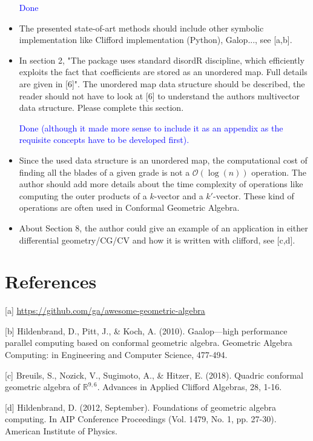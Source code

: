\documentclass{article}
\begin{document}
\begin{itemize}
  \textcolor{blue}{Done}
  
\item The presented state-of-art methods should include other symbolic
  implementation like Clifford implementation (Python), Galop..., see
  [a,b].

\item In section 2, "The package uses standard disordR discipline,
  which efficiently exploits the fact that coefficients are stored as
  an unordered map.  Full details are given in [6]".  The unordered
  map data structure should be described, the reader should not have
  to look at [6] to understand the authors multivector data
  structure. Please complete this section.

\textcolor{blue}{Done (although it made more sense to include it as an
  appendix as the requisite concepts have to be developed first).}
  
\item Since the used data structure is an unordered map, the
  computational cost of finding all the blades of a given grade is not
  a $\mathcal{O}(\log(n))$ operation.  The author should add more
  details about the time complexity of operations like computing the
  outer products of a $k$-vector and a $k'$-vector.  These kind of
  operations are often used in Conformal Geometric Algebra.

\item About Section 8, the author could give an example of an
  application in either differential geometry/CG/CV and how it is
  written with clifford, see [c,d].

\end{itemize}

\section*{References}

\begin{description}
\item{[a]} \url{https://github.com/ga/awesome-geometric-algebra}
\item{[b]} Hildenbrand, D., Pitt, J., \& Koch, A. (2010).
  Gaalop---high performance parallel computing based on conformal
  geometric algebra.  Geometric Algebra Computing: in Engineering and
  Computer Science, 477-494.
\item{[c]} Breuils, S., Nozick, V., Sugimoto, A., \& Hitzer,
  E. (2018).  Quadric conformal geometric algebra of
  $\mathbb{R}^{9,6}$.  Advances in Applied Clifford Algebras, 28,
  1-16.
\item{[d]} Hildenbrand, D. (2012, September).  Foundations of geometric
  algebra computing.  In AIP Conference Proceedings (Vol. 1479, No. 1,
  pp. 27-30).  American Institute of Physics.
\end{description}
\end{document}
